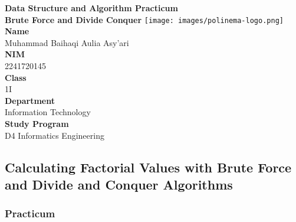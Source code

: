 \documentclass[12pt,titlepage]{article}
\newcommand{\vSubject}{Data Structure and Algorithm Practicum}
\newcommand{\vSubtitle}{Brute Force and Divide Conquer}
\newcommand{\vName}{Muhammad Baihaqi Aulia Asy'ari}
\newcommand{\vNIM}{2241720145}
\newcommand{\vClass}{1I}
\newcommand{\vDepartment}{Information Technology}
\newcommand{\vStudyProgram}{D4 Informatics Engineering}
\begin{document}
\begin{titlepage}
    \centering
    \vfill
    {\bfseries\LARGE
        \vSubject\\
        \vskip0.25cm
        \vSubtitle
    }
    \vfill
    \texttt{[image: images/polinema-logo.png]}
    \vfill
    {
        \textbf{Name}\\
        \vName\\
        \vskip0.5cm
        \textbf{NIM}\\
        \vNIM\\
        \vskip0.5cm
        \textbf{Class}\\
        \vClass\\
        \vskip0.5cm
        \textbf{Department}\\
        \vDepartment\\
        \vskip0.5cm
        \textbf{Study Program}\\
        \vStudyProgram
    }
\end{titlepage}

\newpage

\setcounter{section}{2}
\setcounter{subsection}{2}
\subsection{Calculating Factorial Values with Brute Force and Divide and Conquer Algorithms}
\subsubsection{Practicum}
\end{document}
